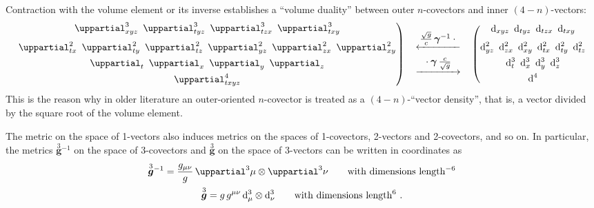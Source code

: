 \documentclass[\ifafour a4paper,12pt,\else a5paper,10pt,\fi%
onecolumn,oneside,article,%
british%
]{memoir}
\theoremstyle{remark}
\theoremstyle{innote}
\newcommand*{\de}{\uppartial}%
\newcommand*{\di}{\mathrm{d}}%
\renewcommand*{\|}[1][]{\nonscript\:#1\vert\nonscript\:\mathopen{}}
\newcommand*{\se}[1]{\de_{#1}}
\newcommand*{\sse}[1]{\de^{2}_{#1}}
\newcommand*{\ssse}[1]{\de^{3}_{#1}}
\newcommand*{\sssse}[1]{\de^{4}_{#1}}
\newcommand*{\ttte}[1]{\de^{3}{#1}}
\newcommand*{\ti}[1]{\di_{#1}}
\newcommand*{\tti}[1]{\di^{2}_{#1}}
\newcommand*{\ttti}[1]{\di^{3}_{#1}}
\newcommand*{\tttti}[1]{\di^{4}_{#1}}
\newcommand*{\ygg}[1][]{\overset{#1}{\bm{g}}{}}
\newcommand*{\dg}{\sqrt{g}}
\newcommand*{\ve}{\bm{\gamma}}
\newcommand*{\vi}{\bm{\gamma}^{-1}}
\begin{document}
Contraction with the volume element or its inverse establishes a \enquote{volume duality} between outer $n$-covectors and inner $(4-n)$-vectors:
\begin{equation}
  \label{eq:volume_duality}
  \left.
\begin{gathered}
  \ssse{xyz}\enspace
  \ssse{tyz}\enspace
  \ssse{tzx}\enspace
  \ssse{txy}
  \\[\jot]
  \sse{tx}\enspace
  \sse{ty}\enspace
  \sse{tz}\enspace
  \sse{yz}\enspace
  \sse{zx}\enspace
  \sse{xy}
  \\
  \se{t}\enspace
  \se{x}\enspace
  \se{y}\enspace
  \se{z}
  \\
  \sssse{txyz}
\end{gathered}
\right)\quad
\begin{gathered}
  \xleftarrow{\qquad\mathclap{\textstyle\frac{\dg}{c}\,\vi\cdot{}}\qquad}
  \\
  \xrightarrow{\qquad\mathclap{\textstyle{}\cdot\ve\,\frac{c}{\dg}}\qquad}
\end{gathered}
\quad%
\left(
\begin{gathered}
  \ti{xyz}\enspace
  \ti{tyz}\enspace
  \ti{tzx}\enspace
  \ti{txy}
  \\[\jot]
  \tti{yz}\enspace
  \tti{zx}\enspace
  \tti{xy}\enspace
  \tti{tx}\enspace
  \tti{ty}\enspace
  \tti{tz}
  \\
  \ttti{t}\enspace
  \ttti{x}\enspace
  \ttti{y}\enspace
  \ttti{z}
  \\
  \tttti{}
\end{gathered}
\right.
\end{equation}
This is the reason why in older literature an outer-oriented $n$-covector is treated as a $(4-n)$-\enquote{vector density}, that is, a vector divided by the square root of the volume element.

\medskip

The metric on the space of 1-vectors also induces metrics on the spaces of 1-covectors, 2-vectors and 2-covectors, and so on. In particular, the metrics $\ygg[3]^{-1}$ on the space of 3-covectors and $\ygg[3]$ on the space of 3-vectors can be written in coordinates as
\begin{gather}
  \label{eq:3-covvect_metrics}
  \ygg[3]^{-1} = \frac{g_{\mu\nu}}{g}\,\ttte{\mu}\otimes\ttte{\nu}
  \qquad\text{with dimensions length${}^{-6}$}
  \\
  \label{eq:3-vect_metrics}
  \ygg[3] = g\,g^{\mu\nu}\,\ttti{\mu}\otimes\ttti{\nu}
  \qquad\text{with dimensions length${}^{6}$} \ .
\end{gather}
\end{document}
